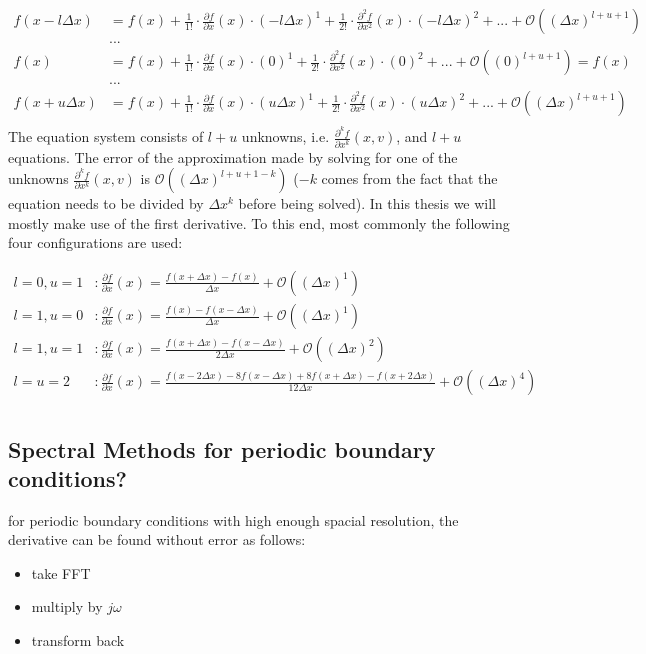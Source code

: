 \begin{align*}
f(x - l \Delta x) &= f(x) + \frac{1}{1!}\cdot\frac{\partial f}{\partial x}(x)\cdot (-l\Delta x)^1 + \frac{1}{2!}\cdot\frac{\partial^2 f}{\partial x^2}(x)\cdot (-l\Delta x)^2 + ... + \mathcal{O}((\Delta x) ^{l+u+1})\\
&...\\
f(x) &= f(x) + \frac{1}{1!}\cdot\frac{\partial f}{\partial x}(x)\cdot (0)^1 + \frac{1}{2!}\cdot\frac{\partial^2 f}{\partial x^2}(x)\cdot (0)^2 + ... + \mathcal{O}((0) ^{l+u+1})= f(x)\\
&...\\
f(x + u \Delta x) &= f(x) + \frac{1}{1!}\cdot\frac{\partial f}{\partial x}(x)\cdot (u\Delta x)^1 + \frac{1}{2!}\cdot\frac{\partial^2 f}{\partial x^2}(x)\cdot (u\Delta x)^2 + ... + \mathcal{O}((\Delta x) ^{l+u+1})\\
\end{align*}
The equation system consists of $l+u$ unknowns, i.e. $\frac{\partial^k f}{\partial x^k}(x,v)$, and $l+u$ equations.
The error of the approximation made by solving for one of the unknowns $\frac{\partial^k f}{\partial x^k}(x,v)$ is $\mathcal{O}((\Delta x) ^{l+u+1-k})$ ($-k$ comes from the fact that the equation needs to be divided by $\Delta x ^k$ before being solved).
In this thesis we will mostly make use of the first derivative.
To this end, most commonly the following four configurations are used:

\begin{align*}
l=0,u=1&: \frac{\partial f}{\partial x}(x) = \frac{f(x+\Delta x) - f(x)}{\Delta x} + \mathcal{O}((\Delta x)^{1})\\
l=1,u=0&: \frac{\partial f}{\partial x}(x) = \frac{f(x) - f(x-\Delta x)}{\Delta x} + \mathcal{O}((\Delta x)^{1})\\
l=1,u=1&: \frac{\partial f}{\partial x}(x) = \frac{f(x + \Delta x) - f(x-\Delta x)}{2\Delta x} + \mathcal{O}((\Delta x)^{2})\\
l=u=2&: \frac{\partial f}{\partial x}(x) = \frac{f(x-2\Delta x) -8 f(x-\Delta x) + 8 f(x+\Delta x) - f(x+2\Delta x)}{12\Delta x} + \mathcal{O}((\Delta x)^{4})\\
\end{align*}

\subsection{Spectral Methods for periodic boundary conditions?}
for periodic boundary conditions with high enough spacial resolution, the derivative can be found without error as follows:
\begin{itemize}
\item take FFT
\item multiply by $j\omega$
\item transform back
\end{itemize}


